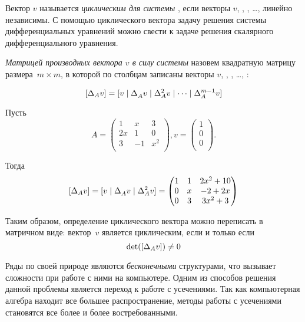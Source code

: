 Вектор $v$ называется \emph{циклическим для системы} , если векторы $v$, \diffVector, \diffVector[2], \dots, \diffVector[m-1] линейно независимы.
С помощью циклического вектора задачу решения системы дифференциальных уравнений можно свести к задаче решения скалярного дифференциального уравнения.

\emph{Матрицей производных вектора $v$ в силу системы}  назовем квадратную матрицу размера~$m \times m$,
в которой по столбцам записаны векторы $v$, \diffVector, \diffVector[2], \dots, \diffVector[m-1]:

\begin{equation}
	\diffMatrix = [v \mid \diffVector \mid \diffVector[2] \mid \dots \mid \diffVector[m-1]]
	\label{diffMatrix}
\end{equation}

\begin{example}
	Пусть
	\begin{equation*}
		A = 
		\begin{pmatrix}
			1 & x & 3 \\
			2x & 1 & 0 \\
			3 & -1 & x^2 \\
		\end{pmatrix},
		v =
		\begin{pmatrix}
			1 \\
			0 \\
			0 \\
		\end{pmatrix}.
	\end{equation*}
    
	Тогда
	\begin{equation*}
		\diffMatrix = [v \mid \diffVector \mid \diffVector[2]] = 
		\begin{pmatrix}
			1 & 1 & 2x^2 + 10 \\
			0 & x & -2 + 2x \\
			0 & 3 & 3x^2 + 3 \\
		\end{pmatrix}
	\end{equation*}
\end{example}

Таким образом, определение циклического вектора можно переписать в матричном виде:
вектор~$v$ является циклическим, если и только если
\begin{equation}
	\dett(\diffMatrix) \neq 0
	\label{diffMatrixNotZero}
\end{equation}

Ряды по своей природе являются \emph{бесконечными} структурами, что вызывает сложности при работе с ними на компьютере.
Одним из способов решения данной проблемы является переход к работе с усечениями.
Так как компьютерная алгебра находит все большее распространение,
методы работы с усечениями становятся все более и более востребованными.
\medskip

